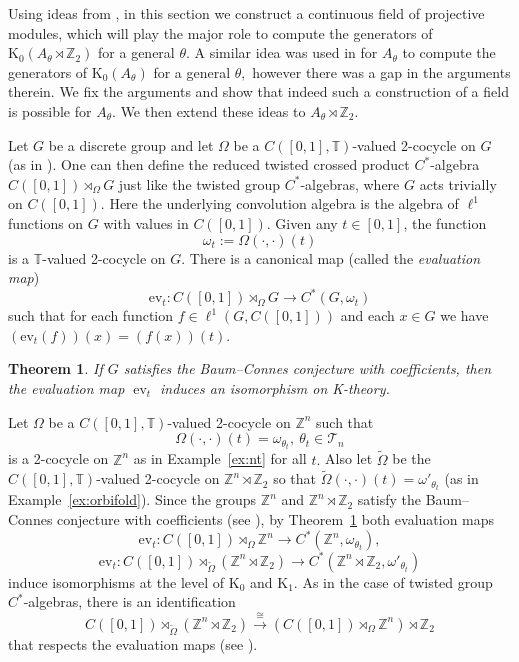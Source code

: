 \documentclass[9pt, BCOR=2mm]{amsart}
\numberwithin{equation}{section}
\numberwithin{equation}{section}
\newtheorem{theorem}{Theorem}[section]
\newcommand{\Z}{{\mathbb{Z}}}
\newcommand{\T}{{\mathbb{T}}}
\newcommand{\K}{\mathrm{K}} %
\DeclareMathOperator{\ev}{ev}
\begin{document}
 Using ideas from \cite{ELPW10}, in this section we construct a continuous field of projective modules,  which will play the major role to compute the generators of $\K_0(A_\theta\rtimes \Z_2)$ for a general $\theta.$ A similar idea was used in \cite{Cha20} for $A_\theta$ to compute the generators of $\K_0(A_\theta)$ for a general $\theta,$ however there was a gap in the arguments therein. We fix the arguments and show that indeed such a construction of a field is possible for $A_\theta.$ We then extend these ideas to $A_\theta\rtimes \Z_2.$  
 
 
 Let $G$ be a discrete group and let $\Omega$ be a $C([0,1],\T)$-valued 2-cocycle on $G$ (as in \cite[Section 1]{ELPW10}). One can then define the reduced twisted crossed product $C^*$-algebra $C([0,1])\rtimes_{ \Omega} G$ just like the twisted group $C^*$-algebras, where $G$ acts trivially on $C([0,1]).$ Here the underlying convolution algebra is the algebra of $\ell^1$ functions on $G$ with values in $C([0,1])$. Given any $t\in [0,1]$, the function 
$$
\omega_t := \Omega(\cdot, \cdot)(t)
$$
is a $\T$-valued 2-cocycle on $G$. There is a canonical map (called the \emph{evaluation map})
$$
\mathrm{ev}_t: C([0,1])\rtimes_{ \Omega} G\to C^*(G, \omega_t)
$$
such that for each function $f\in \ell^1(G, C([0,1]))$ and each $x\in G$ we have $(\mathrm{ev}_t(f))(x) = (f(x))(t)$.





\begin{theorem}
\cite[Corollary 1.11]{ELPW10} \label{thm:ev}
	If $G$ satisfies the Baum--Connes conjecture with coefficients, then the evaluation map $\ev_t$ induces an isomorphism on K-theory.
	\end{theorem} 



	Let $\Omega$ be a $C([0,1],\T)$-valued 2-cocycle on $\Z^n$ such that
	$$
	\Omega( \cdot, \cdot   )(t) = \omega_{\theta_t},~ \theta_t\in \mathcal{T}_n
	$$
	is a 2-cocycle on $\Z^n$ as in Example~\ref{ex:nt} for all $t.$ Also let $\widetilde{\Omega}$ be the $C([0,1],\T)$-valued 2-cocycle on $\Z^n\rtimes \Z_2$ so that $\widetilde{\Omega}( \cdot, \cdot   )(t)=\omega'_{\theta_t}$ (as in Example~\ref{ex:orbifold}). Since the groups $\Z^n$ and $\Z^n\rtimes \Z_2$ satisfy the Baum--Connes conjecture with coefficients (see \cite{HK01}), by Theorem~\ref{thm:ev} both evaluation maps
	$$
	\mathrm{ev}_t: C([0,1])\rtimes_{ \Omega} \Z^n\to C^*(\Z^n, \omega_{\theta_t}),
	$$
	$$
	\mathrm{ev}_t: C([0,1])\rtimes_{ \widetilde{\Omega}} (\Z^n \rtimes \Z_2) \to C^*(\Z^n \rtimes \Z_2, \omega'_{\theta_t})
	$$
	induce isomorphisms at the level of $\K_0$ and $\K_1$. As in the case of twisted group $C^*$-algebras, there is an identification
	$$
	C([0,1])\rtimes_{ \widetilde{\Omega}} (\Z^n\rtimes \Z_2) \xrightarrow{\cong} (C([0,1])\rtimes_{ \Omega} \Z^n)\rtimes \Z_2
	$$
	that respects the evaluation maps (see \cite[Remark 2.3]{ELPW10}).   
	
\end{document}
